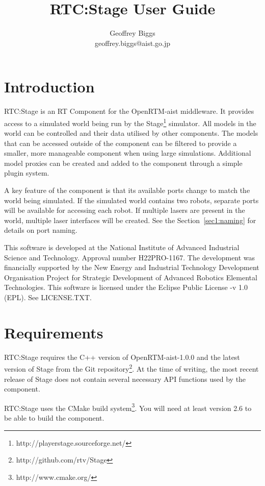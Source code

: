 \documentclass[a4paper,10pt]{article}
\title{RTC:Stage User Guide}
\author{Geoffrey Biggs\\
geoffrey.biggs@aist.go.jp}
\begin{document}
\maketitle

\section{Introduction}
\label{sec:intro}

RTC:Stage is an RT Component for the OpenRTM-aist middleware. It provides
access to a simulated world being run by the
Stage\footnote{http://playerstage.sourceforge.net/} simulator. All models in
the world can be controlled and their data utilised by other components. The
models that can be accessed outside of the component can be filtered to provide
a smaller, more manageable component when using large simulations. Additional
model proxies can be created and added to the component through a simple
plugin system.

A key feature of the component is that its available ports change to match the
world being simulated. If the simulated world contains two robots, separate
ports will be available for accessing each robot. If multiple lasers are
present in the world, multiple laser interfaces will be created. See the
Section~\ref{sec1:naming} for details on port naming.

This software is developed at the National Institute of Advanced Industrial
Science and Technology. Approval number H22PRO-1167. The development was
financially supported by the New Energy and Industrial Technology Development
Organisation Project for Strategic Development of Advanced Robotics Elemental
Technologies.  This software is licensed under the Eclipse Public License -v
1.0 (EPL). See LICENSE.TXT.

\section{Requirements}
\label{sec:requirements}

RTC:Stage requires the C++ version of OpenRTM-aist-1.0.0 and the latest version
of Stage from the Git repository\footnote{http://github.com/rtv/Stage}. At the
time of writing, the most recent release of Stage does not contain several
necessary API functions used by the component.

RTC:Stage uses the CMake build system\footnote{http://www.cmake.org/}. You will
need at least version 2.6 to be able to build the component.
\end{document}
